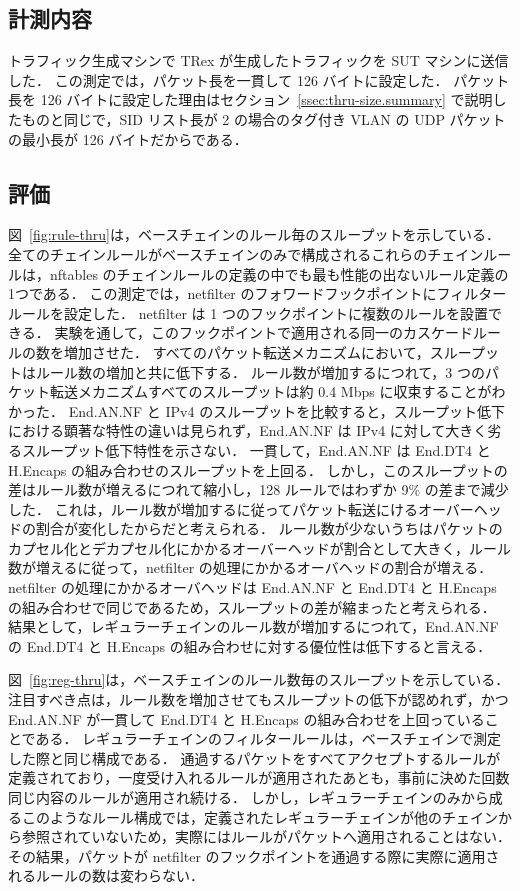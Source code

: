 \subsection{計測内容}
\label{ssec:thru-chains.summary}
トラフィック生成マシンで TRex が生成したトラフィックを SUT マシンに送信した．
この測定では，パケット長を一貫して 126 バイトに設定した．
パケット長を 126 バイトに設定した理由はセクション~\ref{ssec:thru-size.summary} で説明したものと同じで，SID リスト長が 2 の場合のタグ付き VLAN の UDP パケットの最小長が 126 バイトだからである．

\subsection{評価}
\label{ssec:thru-chains.eval}
図~\ref{fig:rule-thru}は，ベースチェインのルール毎のスループットを示している．
全てのチェインルールがベースチェインのみで構成されるこれらのチェインルールは，nftables のチェインルールの定義の中でも最も性能の出ないルール定義の1つである．
この測定では，netfilter のフォワードフックポイントにフィルタールールを設定した．
netfilter は 1 つのフックポイントに複数のルールを設置できる．
実験を通して，このフックポイントで適用される同一のカスケードルールの数を増加させた．
すべてのパケット転送メカニズムにおいて，スループットはルール数の増加と共に低下する．
ルール数が増加するにつれて，3 つのパケット転送メカニズムすべてのスループットは約 0.4 Mbps に収束することがわかった．
End.AN.NF と IPv4 のスループットを比較すると，スループット低下における顕著な特性の違いは見られず，End.AN.NF は IPv4 に対して大きく劣るスループット低下特性を示さない．
一貫して，End.AN.NF は End.DT4 と H.Encaps の組み合わせのスループットを上回る．
しかし，このスループットの差はルール数が増えるにつれて縮小し，128 ルールではわずか 9\% の差まで減少した．
これは，ルール数が増加するに従ってパケット転送にけるオーバーヘッドの割合が変化したからだと考えられる．
ルール数が少ないうちはパケットのカプセル化とデカプセル化にかかるオーバーヘッドが割合として大きく，ルール数が増えるに従って，netfilter の処理にかかるオーバヘッドの割合が増える．
netfilter の処理にかかるオーバヘッドは End.AN.NF と End.DT4 と H.Encaps の組み合わせで同じであるため，スループットの差が縮まったと考えられる．
結果として，レギュラーチェインのルール数が増加するにつれて，End.AN.NF の End.DT4 と H.Encaps の組み合わせに対する優位性は低下すると言える．


図~\ref{fig:reg-thru}は，ベースチェインのルール数毎のスループットを示している．
注目すべき点は，ルール数を増加させてもスループットの低下が認めれず，かつ End.AN.NF が一貫して End.DT4 と H.Encaps の組み合わせを上回っていることである．
レギュラーチェインのフィルタールールは，ベースチェインで測定した際と同じ構成である．
通過するパケットをすべてアクセプトするルールが定義されており，一度受け入れるルールが適用されたあとも，事前に決めた回数同じ内容のルールが適用され続ける．
しかし，レギュラーチェインのみから成るこのようなルール構成では，定義されたレギュラーチェインが他のチェインから参照されていないため，実際にはルールがパケットへ適用されることはない．
その結果，パケットが netfilter のフックポイントを通過する際に実際に適用されるルールの数は変わらない．

